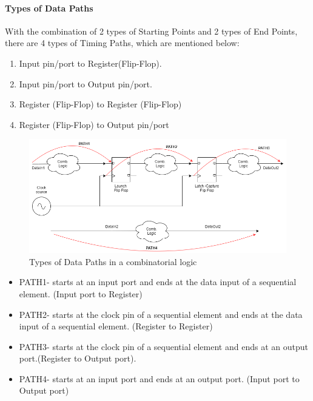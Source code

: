 \paragraph{Types of Data Paths}
With the combination of 2 types of Starting Points and 2 types of End Points, there are 4 types of Timing Paths, which are mentioned below:
\begin{enumerate}
    \item Input pin/port to Register(Flip-Flop). 
    \item Input pin/port to Output pin/port.
    \item Register (Flip-Flop) to Register (Flip-Flop)
    \item Register (Flip-Flop) to Output pin/port
\end{enumerate}

\begin{figure}[H]
\begin{center}
\includegraphics[width=\textwidth]{images/STADataPath.png}
\caption{Types of Data Paths in a combinatorial logic}
\label{STADataPath}
\end{center}
\end{figure}

\begin{itemize}
    \item PATH1- starts at an input port and ends at the data input of a sequential element. (Input port to Register)
    \item PATH2- starts at the clock pin of a sequential element and ends at the data input of a sequential element. (Register to Register)
    \item PATH3- starts at the clock pin of a sequential element and ends at an output port.(Register to Output port).
    \item PATH4- starts at an input port and ends at an output port. (Input port to Output port)
\end{itemize}

